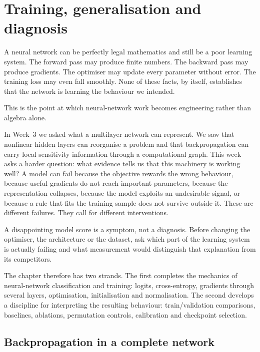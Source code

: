 \chapter{Training, generalisation and diagnosis}
\label{chap:week04}

A neural network can be perfectly legal mathematics and still be a poor learning system. The forward pass may produce finite numbers. The backward pass may produce gradients. The optimiser may update every parameter without error. The training loss may even fall smoothly. None of these facts, by itself, establishes that the network is learning the behaviour we intended.

This is the point at which neural-network work becomes engineering rather than algebra alone.

In Week~3 we asked what a multilayer network can represent. We saw that nonlinear hidden layers can reorganise a problem and that backpropagation can carry local sensitivity information through a computational graph. This week asks a harder question: what evidence tells us that this machinery is working well? A model can fail because the objective rewards the wrong behaviour, because useful gradients do not reach important parameters, because the representation collapses, because the model exploits an undesirable signal, or because a rule that fits the training sample does not survive outside it. These are different failures. They call for different interventions.

\begin{keyidea}
A disappointing model score is a symptom, not a diagnosis. Before changing the optimiser, the architecture or the dataset, ask which part of the learning system is actually failing and what measurement would distinguish that explanation from its competitors.
\end{keyidea}

The chapter therefore has two strands. The first completes the mechanics of neural-network classification and training: logits, cross-entropy, gradients through several layers, optimisation, initialisation and normalisation. The second develops a discipline for interpreting the resulting behaviour: train/validation comparisons, baselines, ablations, permutation controls, calibration and checkpoint selection.

\section{Backpropagation in a complete network}

